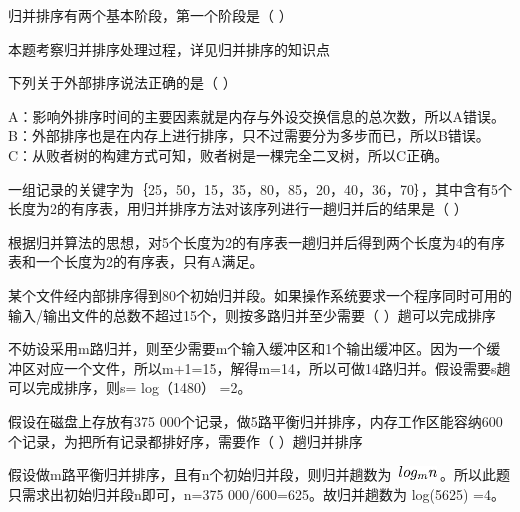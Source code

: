 \question 归并排序有两个基本阶段，第一个阶段是（ ）
\par{}
\begin{solution}本题考察归并排序处理过程，详见归并排序的知识点
\end{solution}
\question 下列关于外部排序说法正确的是（ ）
\par{}
\begin{solution}A：影响外排序时间的主要因素就是内存与外设交换信息的总次数，所以A错误。
B：外部排序也是在内存上进行排序，只不过需要分为多步而已，所以B错误。
C：从败者树的构建方式可知，败者树是一棵完全二叉树，所以C正确。
\end{solution}
\question 一组记录的关键字为｛25，50，15，35，80，85，20，40，36，70｝，其中含有5个长度为2的有序表，用归并排序方法对该序列进行一趟归并后的结果是（
）
\par{}
\begin{solution}根据归并算法的思想，对5个长度为2的有序表一趟归并后得到两个长度为4的有序表和一个长度为2的有序表，只有A满足。
\end{solution}
\question 某个文件经内部排序得到80个初始归并段。如果操作系统要求一个程序同时可用的输入/输出文件的总数不超过15个，则按多路归并至少需要（
）趟可以完成排序
\par{}
\begin{solution}不妨设采用m路归并，则至少需要m个输入缓冲区和1个输出缓冲区。因为一个缓冲区对应一个文件，所以m+1=15，解得m=14，所以可做14路归并。假设需要s趟可以完成排序，则s=
log（1480） =2。
\end{solution}
\question 假设在磁盘上存放有375
000个记录，做5路平衡归并排序，内存工作区能容纳600个记录，为把所有记录都排好序，需要作（
）趟归并排序
\par{}
\begin{solution}假设做m路平衡归并排序，且有n个初始归并段，则归并趟数为
\includegraphics[width=0.45833in,height=0.14583in]{texmath/6261695Cdpi7B3507Dlog_mn}。所以此题只需求出初始归并段n即可，n=375
000/600=625。故归并趟数为 log(5625) =4。
\end{solution}
